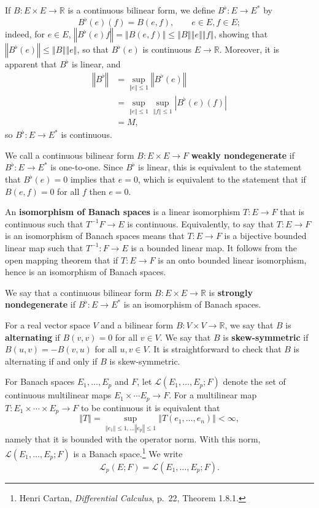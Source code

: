 \documentclass{article}
\newcommand{\norm}[1]{\left\Vert #1 \right\Vert}
\theoremstyle{definition}
\begin{document}
If $B:E \times E \to \mathbb{R}$ is a continuous bilinear form,
we define 
$B^\flat:E \to E^*$ by
\[
B^\flat(e)(f) = B(e,f), \qquad e \in E, f \in E;
\]
indeed, for $e \in E$, $\norm{B^\flat(e)f} = \norm{B(e,f)} \leq \norm{B} \norm{e} \norm{f}$, showing that
$\norm{B^\flat(e)} \leq \norm{B} \norm{e}$, so that
$B^\flat(e)$ is continuous $E \to \mathbb{R}$. Moreover, it is apparent that $B^\flat$ is linear, and
\begin{align*}
\norm{B^\flat}&=\sup_{\norm{e} \leq 1} \norm{B^\flat(e)}\\
&=\sup_{\norm{e} \leq 1} \sup_{\norm{f} \leq 1} |B^\flat(e)(f)|\\
&=M,
\end{align*}
so $B^\flat:E \to E^*$ is continuous. 

We call a continuous bilinear form $B:E \times E \to F$ \textbf{weakly nondegenerate} if $B^\flat:E \to E^*$
is one-to-one. Since $B^\flat$ is linear, this is equivalent to the statement that
$B^\flat(e)=0$ implies that $e=0$, which is equivalent to the statement that
 if $B(e,f)=0$ for all $f$ then $e=0$.
 
An \textbf{isomorphism of Banach spaces} is a linear isomorphism $T:E \to F$ that is continuous such that
$T^{-1}F \to E$ is continuous. Equivalently, to say that $T:E \to F$ is an isomorphism of Banach spaces
means that $T:E \to F$ is a bijective bounded linear map such that $T^{-1}:F \to E$ is a bounded linear map.
It follows from the open mapping theorem that if $T:E \to F$ is an onto bounded linear isomorphism, hence is an isomorphism of Banach spaces.

 We say that a continuous bilinear form $B:E \times E \to \mathbb{R}$ is \textbf{strongly nondegenerate} if $B^\flat:E \to E^*$ is an isomorphism of Banach spaces. 

For a real vector space $V$ and a bilinear form $B:V \times V \to \mathbb{R}$, we say that
$B$ is \textbf{alternating} if $B(v,v)=0$ for all $v \in V$. We say that $B$ is \textbf{skew-symmetric} if 
$B(u,v)=-B(v,u)$ for all $u,v \in V$. It is straightforward to check that $B$ is alternating if and only if $B$ is skew-symmetric.


For Banach spaces $E_1,\ldots,E_p$ and $F$, let
$\mathscr{L}(E_1,\ldots,E_p;F)$ denote the set of continuous multilinear maps
$E_1 \times \cdots E_p \to F$. For a multilinear map $T:E_1 \times \cdots \times E_p \to F$ to be continuous it is equivalent that
\[
\norm{T} = \sup_{\norm{e_1} \leq 1, \ldots \norm{e_p} \leq 1} \norm{T(e_1,\ldots,e_n)}
< \infty,
\]
namely that it is bounded with the operator norm. 
With this norm, $\mathscr{L}(E_1,\ldots,E_p;F)$ is a Banach space.\footnote{Henri Cartan, {\em Differential Calculus}, p.~22, Theorem 1.8.1.} 
We write
\[
\mathscr{L}_p(E;F) = \mathscr{L}(E_1,\ldots,E_p;F).
\]
\end{document}
